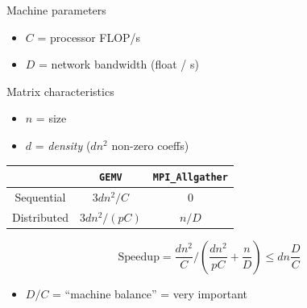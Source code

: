 \documentclass[xcolor={x11names,svgnames},x11names,svgnames]{beamer}
\begin{document}
\begin{frame}[label=1d]
\begin{center}
  \end{center}
\end{frame}


\begin{frame}[label=1d]

  \begin{alertblock}{Machine parameters}
    \begin{itemize}
    \item $C$ = processor FLOP/s
    \item $D$ = network bandwidth (float / s)
    \end{itemize}
  \end{alertblock}

  \begin{exampleblock}{Matrix characteristics}
    \begin{itemize}
    \item $n$ = size
    \item $d$ = \emph{density} ($dn^2$ non-zero coeffs)
    \end{itemize}
  \end{exampleblock}

  \begin{center}
    \begin{tabular}{|c||c|c|}
      \hline
      & \texttt{GEMV}  & \texttt{MPI\_Allgather} \\
      \hline\hline
      Sequential           & $3 d n^2 / C$ &    0 \\
      \hline
      Distributed          & $3 d n^2 / (pC)$ & $n / D$ \\
      \hline
    \end{tabular}
  \end{center}

  \[
    \mathrm{Speedup} = \frac{d n^2}{C} / (\frac{d n^2}{pC} + \frac{n}{D}) \leq d n \frac{D}{C}
  \]

  \begin{itemize}
  \item $D/C$ = ``machine balance'' = very important
 \end{itemize}
\end{frame}
\end{document}
